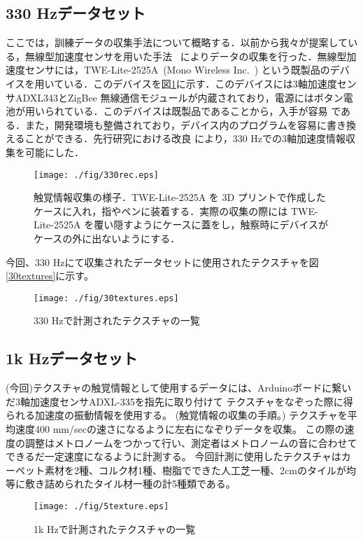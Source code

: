 	\subsection{330 Hzデータセット}
	ここでは，訓練データの収集手法について概略する．以前から我々が提案している，無線型加速度センサを用いた手法
	~\cite{PBL}によりデータの収集を行った．無線型加速度センサには，TWE-Lite-2525A~(Mono Wireless Inc.~\cite{2525})
	という既製品のデバイスを用いている．このデバイスを図\ref{330rec}に示す．このデバイスには3軸加速度センサADXL343とZigBee 
	無線通信モジュールが内蔵されており，電源にはボタン電池が用いられている．このデバイスは既製品であることから，入手が容易
	である．また，開発環境も整備されており，デバイス内のプログラムを容易に書き換えることができる．先行研究における改良
	により，330 Hzでの3軸加速度情報収集を可能にした．
	\begin{figure}[htb]
		\begin{center}
					\texttt{[image: ./fig/330rec.eps]}
					\caption{触覚情報収集の様子．TWE-Lite-2525A を 3D プリントで作成したケースに入れ，指やペンに装着する．実際の収集の際には TWE-Lite-2525A を覆い隠すようにケースに蓋をし，触察時にデバイスがケースの外に出ないようにする．}
					\label{330rec}
		\end{center}
	\end{figure}
	

	今回、330 Hzにて収集されたデータセットに使用されたテクスチャを図\ref{30textures}に示す。
	\begin{figure}
		\begin{center}
					\texttt{[image: ./fig/30textures.eps]}
					\caption{330 Hzで計測されたテクスチャの一覧}
					\label{30texture}
		\end{center}
	\end{figure}
	
	\subsection{1k Hzデータセット}
		(今回)テクスチャの触覚情報として使用するデータには、Arduinoボードに繋いだ3軸加速度センサADXL-335を指先に取り付けて
		テクスチャをなぞった際に得られる加速度の振動情報を使用する。
		(触覚情報の収集の手順。)
		テクスチャを平均速度400 mm/secの速さになるように左右になぞりデータを収集。
		この際の速度の調整はメトロノームをつかって行い、測定者はメトロノームの音に合わせてできるだ一定速度になるように計測する。
		今回計測に使用したテクスチャはカーペット素材を2種、コルク材1種、樹脂でできた人工芝一種、2cmのタイルが均等に敷き詰められたタイル材一種の計5種類である。
		\begin{figure}
			\begin{center}
						\texttt{[image: ./fig/5texture.eps]}
						\caption{1k Hzで計測されたテクスチャの一覧}
						\label{5texture}
			\end{center}
		\end{figure}
		
